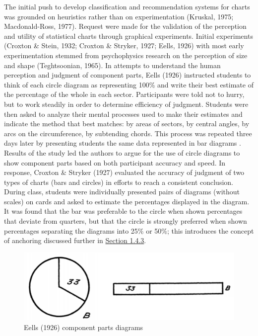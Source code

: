 \documentclass[print]{nuthesis}
\begin{document}
The initial push to develop classification and recommendation systems for charts was grounded on heuristics rather than on experimentation (Kruskal, 1975; Macdonald-Ross, 1977).
Request were made for the validation of the perception and utility of statistical charts through graphical experiments.
Initial experiments (Croxton \& Stein, 1932; Croxton \& Stryker, 1927; Eells, 1926) with most early experimentation stemmed from psychophysics research on the perception of size and shape (Teghtsoonian, 1965).
In attempts to understand the human perception and judgment of component parts, Eells (1926) instructed students to think of each circle diagram  as representing 100\% and write their best estimate of the percentage of the whole in each sector.
Participants were told not to hurry, but to work steadily in order to determine efficiency of judgment.
Students were then asked to analyze their mental processes used to make their estimates and indicate the method that best matches: by areas of sectors, by central angles, by arcs on the circumference, by subtending chords.
This process was repeated three days later by presenting students the same data represented in bar diagrams .
Results of the study led the authors to argue for the use of circle diagrams to show component parts based on both participant accuracy and speed.
In response, Croxton \& Stryker (1927) evaluated the accuracy of judgment of two types of charts (bars and circles) in efforts to reach a consistent conclusion.
During class, students were individually presented pairs of diagrams (without scales) on cards and asked to estimate the percentages displayed in the diagram.
It was found that the bar was preferable to the circle when shown percentages that deviate from quarters, but that the circle is strongly preferred when shown percentages separating the diagrams into 25\% or 50\%; this introduces the concept of anchoring discussed further in \protect\hyperlink{estimation-biases}{Section 1.4.3}.

\begin{figure}[tbp]

{\centering \includegraphics[width=0.75\linewidth,]{images/eells-component-parts} 

}

\caption{Eells (1926) component parts diagrams}\label{fig:eells-compoment-parts}
\end{figure}
\end{document}
